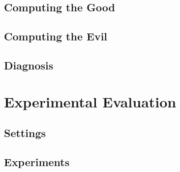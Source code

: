 \documentclass[11pt,titlepage,oneside,openany]{book}
\renewcommand{\algorithmiccomment}[1]{\ensuremath{\rhd} \textit{#1}}
\def\MYCALL#1#2{{\small\textsc{#1}}(\textup{#2})}
\def\MYNOT{\textbf{ not }}
\def\MYBREAK{\textbf{break }}
\def\MYNIL{\textsc{Nil}}
\def\ONT{{\mathcal O}} %
\def\ALI{{\mathcal A}} %
\begin{document}
\section{Computing the Good}
\label{sec:comp-good}

\section{Computing the Evil}
\label{sec:comp-evil}

\section{Diagnosis}
\label{sec:diag}




\chapter{Experimental Evaluation}
\label{cha:exp}




\section{Settings}
\label{sec:setting}

\section{Experiments}
\label{sec:exp}
\end{document}
